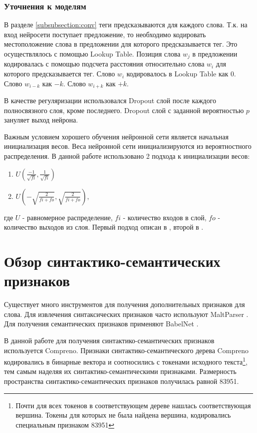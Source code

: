   \subsubsection{Уточнения к моделям}

  В разделе \ref{subsubsection:conv} теги предсказываются для каждого слова.
  Т.к. на вход нейросети поступает предложение, то необходимо кодировать
  местоположение слова в предложении для которого предсказывается тег.
  Это осуществлялось с помощью Lookup Table.
  Позиция слова $w_j$ в предложении кодировалась
  с помощью подсчета расстояния относительно слова $w_i$ для которого предсказывается тег.
  Слово $w_i$ кодировалось в Lookup Table как $0$. Слово $w_{i-k}$ как $-k$. Слово $w_{i+k}$ как $+k$.

  В качестве регуляризации использовался Dropout слой после каждого полносвязного слоя,
  кроме последнего.
  Dropout слой \citep{srivastava2014dropout} с заданной вероятностью $p$ зануляет
  выход нейрона.

  Важным условием хорошего обучения нейронной сети является начальная инициализация
  весов. Веса нейронной сети инициализируются из вероятностного распределения.
  В данной работе использовано 2 подхода к инициализации весов:
  \begin{enumerate}
  \item $U(\frac{-1}{\sqrt{fi}}, \frac{1}{\sqrt{fi}})$
  \item $U(-\sqrt{\frac{2}{fi + fo}}, \sqrt{\frac{2}{fi + fo}}),$
  \end{enumerate}
  где $U$ - равномерное распределение, $fi$ - количество входов в слой,
  $fo$ - количество выходов из слоя.
  Первый подход описан в \citep{collobert2011natural}, второй в \citep{glorot2010understanding}.


  \section{Обзор синтактико-семантических признаков}
    Существует много инструментов для получения дополнительных признаков для слова.
    Для извлечения синтаксических признаков часто используют MaltParser \citep{nivre2006maltparser}.
    Для получения семантических признаков применяют BabelNet \citep{navigli2010babelnet}.

    В данной работе для получения синтактико-семантических признаков используется Compreno.
    Признаки синтактико-семантического дерева Compreno кодировались в бинарные вектора
    и соотносились с токенами исходного
    текста\footnote{Почти для всех токенов в соответствующем дереве нашлась соответствующая вершина.
    Токены для которых не была найдена вершина, кодировались специальным признаком 83951},
    тем самым наделяя их синтактико-се\-ман\-ти\-ческими признаками.
    Размерность пространства синтактико-се\-ман\-ти\-ческих признаков получилась равной 83951.

